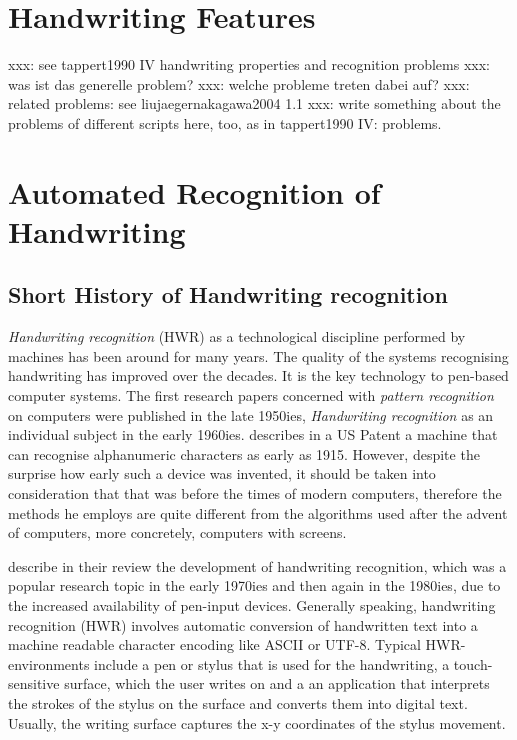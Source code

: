 \section{Handwriting Features}
\label{sec:handwritingfeatures}

xxx: see tappert1990 IV handwriting properties and recognition problems
xxx: was ist das generelle problem?
xxx: welche probleme treten dabei auf?
xxx: related problems: see liujaegernakagawa2004 1.1
xxx: write something about the problems of different scripts here, too, as in tappert1990 IV: problems.


\section{Automated Recognition of Handwriting}
\label{sec:autorecoofhandwriting}

\subsection{Short History of Handwriting recognition}
\label{sec:shorthistoryofhwr}

\emph{Handwriting recognition} (HWR) as a technological discipline performed 
by machines has been around for many years. The quality of the systems 
recognising handwriting has improved over the decades. It is the key 
technology to pen-based computer systems. The first research papers 
concerned with \emph{pattern recognition} on computers were published 
in the late 1950ies, \emph{Handwriting recognition} as an individual subject in 
the early 1960ies.  describes in a US Patent
a machine that can recognise alphanumeric characters as early as 1915. 
However, despite the surprise how early such a device was invented,
it should be taken into consideration that that was before the times 
of modern computers, therefore the methods he employs are quite different 
from the algorithms used after the advent of computers, more concretely, 
computers with screens. 

 describe in their review the development of 
handwriting recognition, which was a popular research topic in the early 
1970ies and then again in the 1980ies, due to the increased availability 
of pen-input devices.  Generally speaking, handwriting recognition (HWR) 
involves automatic conversion of handwritten text into a machine readable 
character encoding like ASCII or UTF-8. Typical HWR-environments include 
a pen or stylus that is used for the handwriting, a touch-sensitive surface, 
which the user writes on and a an application that interprets the strokes 
of the stylus on the surface and converts them into digital text. 
Usually, the writing surface captures the x-y coordinates of the stylus 
movement.

